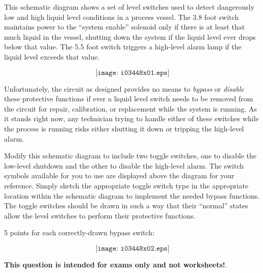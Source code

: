 

This schematic diagram shows a set of level switches used to detect dangerously low and high liquid level conditions in a process vessel.  The 3.8 foot switch maintains power to the ``system enable'' solenoid only if there is at least that much liquid in the vessel, shutting down the system if the liquid level ever drops below that value.  The 5.5 foot switch triggers a high-level alarm lamp if the liquid level exceeds that value.

$$\texttt{[image: i03448x01.eps]}$$

Unfortunately, the circuit as designed provides no means to {\it bypass} or {\it disable} these protective functions if ever a liquid level switch needs to be removed from the circuit for repair, calibration, or replacement while the system is running.  As it stands right now, any technician trying to handle either of these switches while the process is running risks either shutting it down or tripping the high-level alarm.

Modify this schematic diagram to include two toggle switches, one to disable the low-level shutdown and the other to disable the high-level alarm.  The switch symbols available for you to use are displayed above the diagram for your reference.  Simply sketch the appropriate toggle switch type in the appropriate location within the schematic diagram to implement the needed bypass functions.  The toggle switches should be drawn in such a way that their ``normal'' states allow the level switches to perform their protective functions.







5 points for each correctly-drawn bypass switch:

$$\texttt{[image: i03448x02.eps]}$$







{\bf This question is intended for exams only and not worksheets!}.



